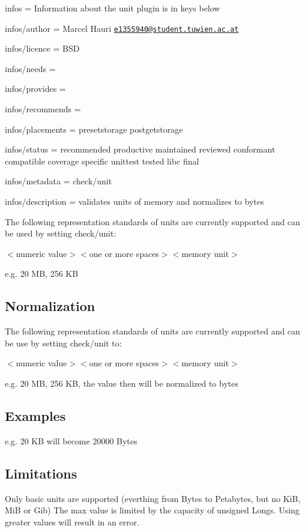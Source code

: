 
\begin{DoxyItemize}
\item infos = Information about the unit plugin is in keys below
\item infos/author = Marcel Hauri \href{mailto:e1355940@student.tuwien.ac.at}{\tt e1355940@student.\+tuwien.\+ac.\+at}
\item infos/licence = B\+SD
\item infos/needs =
\item infos/provides =
\item infos/recommends =
\item infos/placements = presetstorage postgetstorage
\item infos/status = recommended productive maintained reviewed conformant compatible coverage specific unittest tested libc final
\item infos/metadata = check/unit
\item infos/description = validates units of memory and normalizes to bytes
\end{DoxyItemize}

The following representation standards of units are currently supported and can be used by setting {\ttfamily check/unit}\+:


\begin{DoxyItemize}
\item {\ttfamily $<$numeric value$>$$<$one or more spaces$>$$<$memory unit$>$}

e.\+g. 20 MB, 256 KB
\end{DoxyItemize}

\subsection*{Normalization}

The following representation standards of units are currently supported and can be use by setting {\ttfamily check/unit} to\+:


\begin{DoxyItemize}
\item {\ttfamily $<$numeric value$>$$<$one or more spaces$>$$<$memory unit$>$}

e.\+g. 20 MB, 256 KB, the value then will be normalized to bytes
\end{DoxyItemize}

\subsection*{Examples}

e.\+g. 20 KB will become 20000 Bytes

\subsection*{Limitations}

Only basic units are supported (everthing from Bytes to Petabytes, but no KiB, MiB or Gib) The max value is limited by the capacity of unsigned Longs. Using greater values will result in an error. 